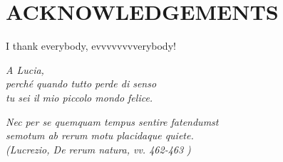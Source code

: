 \chapter*{ACKNOWLEDGEMENTS}
%
I thank everybody, evvvvvvvverybody!
%
\cleardoublepage
~

\begin{flushright}
  \emph{A Lucia, \\
  perch\'{e} quando tutto perde di senso \\
  tu sei il mio piccolo mondo felice.}
  
  \vspace{10cm}
  
   \emph{
   Nec per se quemquam tempus sentire fatendumst \\
   semotum ab rerum motu placidaque quiete. \\
   (Lucrezio, De rerum natura, vv. 462-463 )
   } 
\end{flushright}

\cleardoublepage
